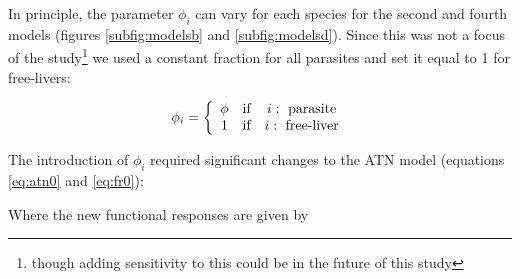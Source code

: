 \documentclass[11pt]{amsart}
\begin{document}
In principle, the parameter $\phi_i$ can vary for each species for the second and fourth models (figures \ref{subfig:modelsb} and \ref{subfig:modelsd}).  Since this was not a focus of the study\footnote{though adding sensitivity to this could be in the future of this study} we used a constant fraction for all parasites and set it equal to 1 for free-livers:

\begin{equation}
\phi_i = 
\left\{
\begin{array}{c c c}
\phi & \text{if} & i:\text{ parasite}\\
1 & \text{if} & i:\text{ free-liver}\\
\end{array}\right.\label{eq:phi}
\end{equation}

The introduction of $\phi_i$ required significant changes to the ATN model (equations \eqref{eq:atn0} and \eqref{eq:fr0}):



Where the new functional responses are given by 

\end{document}
